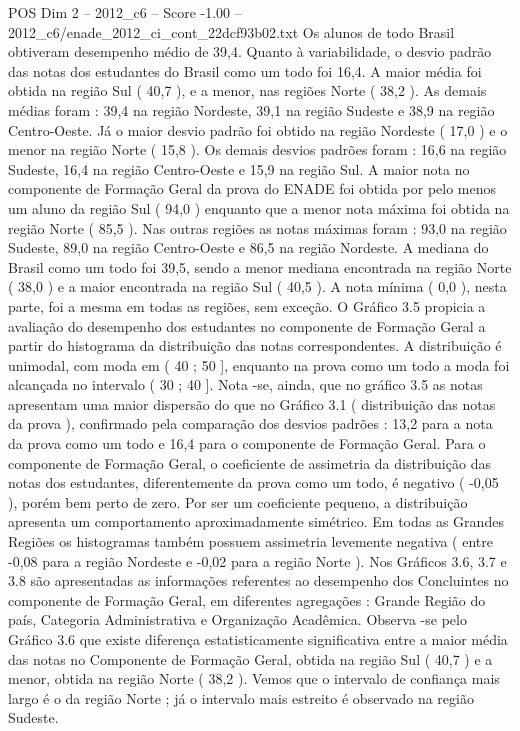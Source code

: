\begin{textsample}{POS Dim 2 – 2012\_c6 – Score -1.00 – 2012\_c6/enade\_2012\_ci\_cont\_22dcf93b02.txt}
Os alunos de todo Brasil obtiveram desempenho médio de 39,4.
Quanto à variabilidade, o desvio padrão das notas dos estudantes do Brasil como um todo foi 16,4.
A maior média foi obtida na região Sul ( 40,7 ), e a menor, nas regiões Norte ( 38,2 ).
As demais médias foram : 39,4 na região Nordeste, 39,1 na região Sudeste e 38,9 na região Centro-Oeste.
Já o maior desvio padrão foi obtido na região Nordeste ( 17,0 ) e o menor na região Norte ( 15,8 ).
Os demais desvios padrões foram : 16,6 na região Sudeste, 16,4 na região Centro-Oeste e 15,9 na região Sul.
A maior nota no componente de Formação Geral da prova do ENADE foi obtida por pelo menos um aluno da região Sul ( 94,0 ) enquanto que a menor nota máxima foi obtida na região Norte ( 85,5 ).
Nas outras regiões as notas máximas foram : 93,0 na região Sudeste, 89,0 na região Centro-Oeste e 86,5 na região Nordeste.
A mediana do Brasil como um todo foi 39,5, sendo a menor mediana encontrada na região Norte ( 38,0 ) e a maior encontrada na região Sul ( 40,5 ).
A nota mínima ( 0,0 ), nesta parte, foi a mesma em todas as regiões, sem exceção.
O Gráfico 3.5 propicia a avaliação do desempenho dos estudantes no componente de Formação Geral a partir do histograma da distribuição das notas correspondentes.
A distribuição é unimodal, com moda em ( 40 ; 50 ], enquanto na prova como um todo a moda foi alcançada no intervalo ( 30 ; 40 ].
Nota -se, ainda, que no gráfico 3.5 as notas apresentam uma maior dispersão do que no Gráfico 3.1 ( distribuição das notas da prova ), confirmado pela comparação dos desvios padrões : 13,2 para a nota da prova como um todo e 16,4 para o componente de Formação Geral.
Para o componente de Formação Geral, o coeficiente de assimetria da distribuição das notas dos estudantes, diferentemente da prova como um todo, é negativo ( -0,05 ), porém bem perto de zero.
Por ser um coeficiente pequeno, a distribuição apresenta um comportamento aproximadamente simétrico.
Em todas as Grandes Regiões os histogramas também possuem assimetria levemente negativa ( entre -0,08 para a região Nordeste e -0,02 para a região Norte ).
Nos Gráficos 3.6, 3.7 e 3.8 são apresentadas as informações referentes ao desempenho dos Concluintes no componente de Formação Geral, em diferentes agregações : Grande Região do país, Categoria Administrativa e Organização Acadêmica.
Observa -se pelo Gráfico 3.6 que existe diferença estatisticamente significativa entre a maior média das notas no Componente de Formação Geral, obtida na região Sul ( 40,7 ) e a menor, obtida na região Norte ( 38,2 ).
Vemos que o intervalo de confiança mais largo é o da região Norte ; já o intervalo mais estreito é observado na região Sudeste.

\end{textsample}
